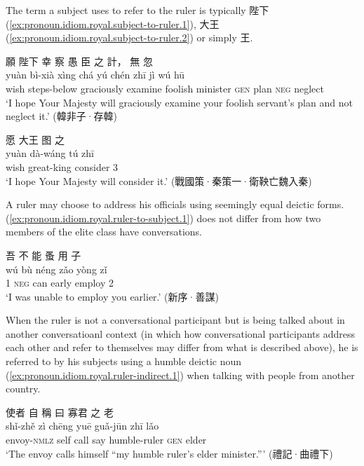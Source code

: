 \documentclass[UTF8, a4paper, oneside, scheme=plain, 12pt]{ctexrep}
\newcommand{\translate}[1]{`#1'}
\newcommand*{\category}[1]{\textsc{#1}}
\begin{document}
The term a subject uses to refer to the ruler is typically 陛下 (\ref{ex:pronoun.idiom.royal.subject-to-ruler.1}), 大王 (\ref{ex:pronoun.idiom.royal.subject-to-ruler.2}) or simply 王.

\begin{exe}
    \ex\label{ex:pronoun.idiom.royal.subject-to-ruler.1}
    \glll 願 陛下 幸 察 愚 臣 之 計， 無 忽 \\
    yuàn bì-xià xìng chá yú chén zhī jì wú hū \\
    wish steps-below graciously examine foolish minister \category{gen} plan \category{neg} neglect \\
    \glt\translate{I hope Your Majesty will graciously examine your foolish servant's plan and not neglect it.} \hfill (韓非子·存韓)

    \ex\label{ex:pronoun.idiom.royal.subject-to-ruler.2}
    \glll 愿 大王 图 之 \\
    yuàn dà-wáng tú zhī \\
    wish great-king consider 3 \\
    \glt\translate{I hope Your Majesty will consider it.} \hfill (戰國策·秦策一·衛鞅亡魏入秦)
\end{exe}

A ruler may choose to address his officials using seemingly equal deictic forms.
(\ref{ex:pronoun.idiom.royal.ruler-to-subject.1}) does not differ from how two members of the elite class have conversations.


\begin{exe}
    \ex\label{ex:pronoun.idiom.royal.ruler-to-subject.1}
    \glll 吾 不 能 蚤 用 子 \\
    wú bù néng zǎo yòng zǐ \\
    1 \category{neg} can early employ 2 \\
    \glt\translate{I was unable to employ you earlier.} \hfill (新序·善謀)
\end{exe}

When the ruler is not a conversational participant but is being talked about in another conversatioanl context
(in which how conversational participants address each other and refer to themselves may differ from what is described above),
he is referred to by his subjects using a humble deictic noun (\ref{ex:pronoun.idiom.royal.ruler-indirect.1}) when talking with people from another country.

\begin{exe}
    \ex\label{ex:pronoun.idiom.royal.ruler-indirect.1}
    \glll 使者 自 稱 曰 寡君 之 老 \\
    shǐ-zhě zì chēng yuē guǎ-jūn zhī lǎo \\
    envoy-\category{nmlz} self call say humble-ruler \category{gen} elder \\
    \glt\translate{The envoy calls himself ``my humble ruler's elder minister.''} \hfill (禮記·曲禮下)
\end{exe}
\end{document}
